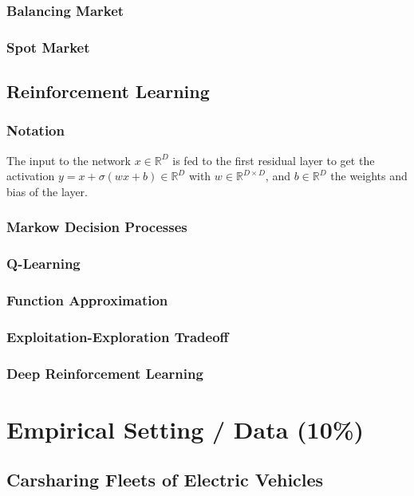 \documentclass[12pt, article]{article}
\begin{document}
\subsubsection{Balancing Market}
\label{sec:org5caaed0}
\subsubsection{Spot Market}
\label{sec:org2f75a1d}
\subsection{Reinforcement Learning}
\label{sec:orgb3aa847}
\subsubsection{Notation}
\label{sec:orgfcf6441}
The input to the network \(x \in \mathbb{R}^D\) is fed to the first residual layer to get the activation \(y = x + \sigma(w x + b) \in \mathbb{R}^D\) with \(w \in \mathbb{R}^{D \times D}\), and \(b \in \mathbb{R}^D\) the weights and bias of the layer.
\subsubsection{Markow Decision Processes}
\label{sec:org260b44f}
\subsubsection{Q-Learning}
\label{sec:org4f5f4e6}
\subsubsection{Function Approximation}
\label{sec:org9fad7af}
\subsubsection{Exploitation-Exploration Tradeoff}
\label{sec:orgbddec1e}
\subsubsection{Deep Reinforcement Learning}
\label{sec:org96d7cad}
\section{Empirical Setting / Data (10\%)}
\label{sec:org817d906}
\subsection{Carsharing Fleets of Electric Vehicles}
\label{sec:org286162e}
\end{document}
